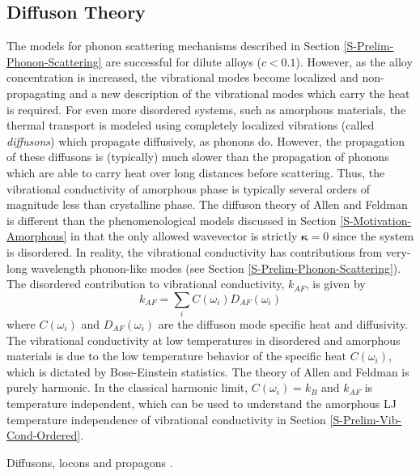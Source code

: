 \documentclass[aps,prb,preprint,superscriptaddress,amsmath,amssymb,floatfix]{revtex4}
\begin{document}
\subsection{\label{S:Lifetimes}Diffuson Theory}
The models for phonon scattering mechanisms described in Section 
\ref{S-Prelim-Phonon-Scattering} are successful for dilute alloys 
($c<0.1$).\cite{klemens1955,klemens1957} However, as the alloy 
concentration is increased, the vibrational modes become localized and 
non-propagating and a new description of the vibrational modes which 
carry the heat is required. For even more disordered systems, such as 
amorphous materials, the thermal transport is modeled using completely 
localized vibrations (called \emph{diffusons}) which propagate diffusively, 
as phonons do.\cite{allen1993} However, the propagation of these diffusons 
is (typically) much slower than the propagation of phonons which are able 
to carry heat over long distances before scattering. Thus, the vibrational 
conductivity of amorphous phase is typically several orders of magnitude 
less than crystalline phase.\cite{freeman1986,cahill1992}
The diffuson theory of Allen and Feldman is different than the 
phenomenological models discussed in Section \ref{S-Motivation-Amorphous} 
in that the only allowed wavevector is strictly $\mathbf{\kappa}= 0$ since 
the system is disordered. In reality, the vibrational conductivity has 
contributions from very-long wavelength phonon-like modes (see Section 
\ref{S-Prelim-Phonon-Scattering}). The disordered contribution to 
vibrational conductivity, $k_{AF}$, is given by
\begin{equation}\label{EQ:M:k_AF}
k_{AF} = \sum_i C(\omega_i) D_{AF}(\omega_i)
\end{equation}
where $C(\omega_i)$ and $D_{AF}(\omega_i)$ are the diffuson mode specific 
heat and diffusivity. The vibrational conductivity at low temperatures in 
disordered and amorphous materials is due to the low temperature behavior 
of the specific heat $C(\omega_i)$, which is dictated by Bose-Einstein 
statistics.\cite{allen1993} The theory of Allen and Feldman is purely 
harmonic. In the classical harmonic limit, $C(\omega_i) = k_{B}$ and 
$k_{AF}$ is temperature independent, which can be used to understand the 
amorphous LJ temperature independence of vibrational conductivity in Section 
\ref{S-Prelim-Vib-Cond-Ordered}.

Diffusons, locons and propagons \cite{allen_diffusons_1999}.
\end{document}
